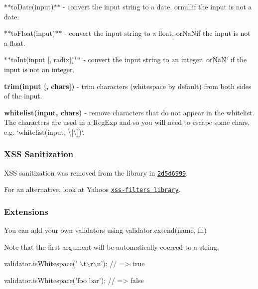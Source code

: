 \begin{DoxyItemize}
\item {\ttfamily $\ast$$\ast$to\+Date(input)$\ast$$\ast$ -\/ convert the input string to a date, or}null{\ttfamily if the input is not a date.}
\item {\ttfamily $\ast$$\ast$to\+Float(input)$\ast$$\ast$ -\/ convert the input string to a float, or}NaN{\ttfamily if the input is not a float.}
\item {\ttfamily $\ast$$\ast$to\+Int(input \mbox{[}, radix\mbox{]})$\ast$$\ast$ -\/ convert the input string to an integer, or}Na\+N` if the input is not an integer.
\item {\bfseries trim(input \mbox{[}, chars\mbox{]})} -\/ trim characters (whitespace by default) from both sides of the input.
\item {\bfseries whitelist(input, chars)} -\/ remove characters that do not appear in the whitelist. The characters are used in a Reg\+Exp and so you will need to escape some chars, e.\+g. `whitelist(input, \textquotesingle{}\textbackslash{}\mbox{[}\textbackslash{}\mbox{]}\textquotesingle{})`.
\end{DoxyItemize}

\subsubsection*{X\+SS Sanitization}

X\+SS sanitization was removed from the library in \href{https://github.com/chriso/validator.js/commit/2d5d6999541add350fb396ef02dc42ca3215049e}{\tt 2d5d6999}.

For an alternative, look at Yahoo\textquotesingle{}s \href{https://github.com/yahoo/xss-filters}{\tt xss-\/filters library}.

\subsubsection*{Extensions}

You can add your own validators using {\ttfamily validator.\+extend(name, fn)}




Note that the first argument will be automatically coerced to a string.


\begin{DoxyCode}
validator.isWhitespace('    \(\backslash\)t\(\backslash\)r\(\backslash\)n');
// => true

validator.isWhitespace('foo bar');
// => false
\end{DoxyCode}


